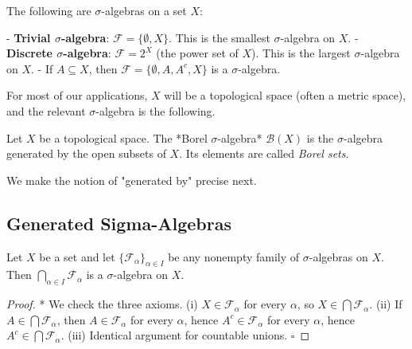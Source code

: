 \begin{example}
The following are $\sigma$-algebras on a set $X$:

- \textbf{Trivial $\sigma$-algebra}: $\mathcal{F} = \{\emptyset, X\}$. This is the smallest $\sigma$-algebra on $X$.
- \textbf{Discrete $\sigma$-algebra}: $\mathcal{F} = 2^X$ (the power set of $X$). This is the largest $\sigma$-algebra on $X$.
- If $A \subseteq X$, then $\mathcal{F} = \{\emptyset, A, A^c, X\}$ is a $\sigma$-algebra.

For most of our applications, $X$ will be a topological space (often a metric space), and the relevant $\sigma$-algebra is the following.
\end{example}


\begin{definition}\label{def:7.3}
Let $X$ be a topological space. The *Borel $\sigma$-algebra* $\mathcal{B}(X)$ is the $\sigma$-algebra generated by the open subsets of $X$. Its elements are called \textit{Borel sets}.

We make the notion of "generated by" precise next.
\end{definition}


\subsection{Generated Sigma-Algebras}\label{sec:7.2.2}

\begin{proposition}\label{prop:7.4.}
Let $X$ be a set and let $\{\mathcal{F}_\alpha\}_{\alpha \in I}$ be any nonempty family of $\sigma$-algebras on $X$. Then $\bigcap_{\alpha \in I} \mathcal{F}_\alpha$ is a $\sigma$-algebra on $X$.
\end{proposition}


\begin{proof}
* We check the three axioms. (i) $X \in \mathcal{F}_\alpha$ for every $\alpha$, so $X \in \bigcap \mathcal{F}_\alpha$. (ii) If $A \in \bigcap \mathcal{F}_\alpha$, then $A \in \mathcal{F}_\alpha$ for every $\alpha$, hence $A^c \in \mathcal{F}_\alpha$ for every $\alpha$, hence $A^c \in \bigcap \mathcal{F}_\alpha$. (iii) Identical argument for countable unions. $\square$

\end{proof}

